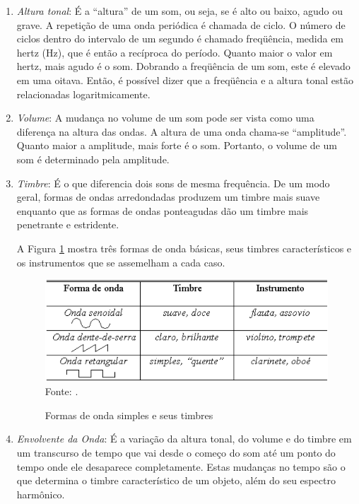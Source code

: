\begin{enumerate}
\item \textit{Altura tonal}: É a “altura” de um som, ou seja, se é alto ou baixo, agudo ou grave. A repetição de uma onda periódica é chamada de ciclo. O número de ciclos dentro do intervalo de um segundo é chamado freqüência, medida em hertz (Hz), que é então a recíproca do período. Quanto maior o valor em hertz, mais agudo é o som. Dobrando a freqüência de um som, este é elevado em uma oitava. Então, é possível dizer que a freqüência e a altura tonal estão relacionadas logaritmicamente.

\item \textit{Volume}: A mudança no volume de um som pode ser vista como uma diferença na altura das ondas. A altura de uma onda chama-se “amplitude”. Quanto maior a amplitude, mais forte é o som. Portanto, o volume de um som é determinado pela amplitude.

\item \textit{Timbre}: É o que diferencia dois sons de mesma frequência. De um modo geral, formas de ondas arredondadas produzem um timbre mais suave enquanto que as formas de ondas ponteagudas dão um timbre mais penetrante e estridente.

A Figura \ref{fig:ondaTimbre} mostra três formas de onda básicas, seus timbres característicos e os instrumentos que se assemelham a cada caso.

\begin{figure}[!htb]
   \centering
   \caption{Formas de onda simples e seus timbres}\label{fig:ondaTimbre} 
   \includegraphics[scale=0.6]{figuras/ondaTimbre.png}
   \\Fonte: \cite{miletto2004}.
\end{figure}

\item \textit{Envolvente da Onda}: É a variação da altura tonal, do volume e do timbre em um transcurso de tempo que vai desde o começo do som até um ponto do tempo onde ele desaparece completamente. Estas mudanças no tempo são o que determina o timbre característico de um objeto, além do seu espectro harmônico.
\end{enumerate}

